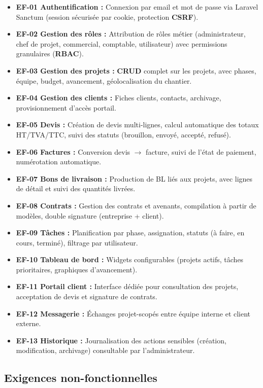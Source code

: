 \begin{itemize}
  \item \textbf{EF-01 Authentification :} Connexion par email et mot de passe via
  Laravel Sanctum (session sécurisée par cookie, protection \textbf{CSRF}).
  \item \textbf{EF-02 Gestion des rôles :} Attribution de rôles métier (administrateur,
  chef de projet, commercial, comptable, utilisateur) avec permissions granulaires
  (\textbf{RBAC}).
  \item \textbf{EF-03 Gestion des projets :} \textbf{CRUD} complet sur les projets,
  avec phases, équipe, budget, avancement, géolocalisation du chantier.
  \item \textbf{EF-04 Gestion des clients :} Fiches clients, contacts, archivage,
  provisionnement d'accès portail.
  \item \textbf{EF-05 Devis :} Création de devis multi-lignes, calcul automatique des
  totaux HT/TVA/TTC, suivi des statuts (brouillon, envoyé, accepté, refusé).
  \item \textbf{EF-06 Factures :} Conversion devis $\rightarrow$ facture, suivi de
  l'état de paiement, numérotation automatique.
  \item \textbf{EF-07 Bons de livraison :} Production de BL liés aux projets, avec
  lignes de détail et suivi des quantités livrées.
  \item \textbf{EF-08 Contrats :} Gestion des contrats et avenants, compilation à
  partir de modèles, double signature (entreprise + client).
  \item \textbf{EF-09 Tâches :} Planification par phase, assignation, statuts
  (à faire, en cours, terminé), filtrage par utilisateur.
  \item \textbf{EF-10 Tableau de bord :} Widgets configurables (projets actifs,
  tâches prioritaires, graphiques d'avancement).
  \item \textbf{EF-11 Portail client :} Interface dédiée pour consultation des projets,
  acceptation de devis et signature de contrats.
  \item \textbf{EF-12 Messagerie :} Échanges projet-scopés entre équipe interne et
  client externe.
  \item \textbf{EF-13 Historique :} Journalisation des actions sensibles (création,
  modification, archivage) consultable par l'administrateur.
\end{itemize}

\subsection{Exigences non-fonctionnelles}

